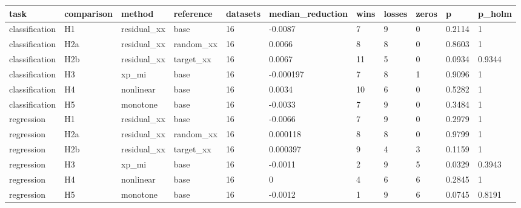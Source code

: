 \begin{tabular}{lllllllllll}
\toprule
task & comparison & method & reference & datasets & median\_reduction & wins & losses & zeros & p & p\_holm \\
\midrule
classification & H1 & residual\_xx & base & 16 & -0.0087 & 7 & 9 & 0 & 0.2114 & 1 \\
classification & H2a & residual\_xx & random\_xx & 16 & 0.0066 & 8 & 8 & 0 & 0.8603 & 1 \\
classification & H2b & residual\_xx & target\_xx & 16 & 0.0067 & 11 & 5 & 0 & 0.0934 & 0.9344 \\
classification & H3 & xp\_mi & base & 16 & -0.000197 & 7 & 8 & 1 & 0.9096 & 1 \\
classification & H4 & nonlinear & base & 16 & 0.0034 & 10 & 6 & 0 & 0.5282 & 1 \\
classification & H5 & monotone & base & 16 & -0.0033 & 7 & 9 & 0 & 0.3484 & 1 \\
regression & H1 & residual\_xx & base & 16 & -0.0066 & 7 & 9 & 0 & 0.2979 & 1 \\
regression & H2a & residual\_xx & random\_xx & 16 & 0.000118 & 8 & 8 & 0 & 0.9799 & 1 \\
regression & H2b & residual\_xx & target\_xx & 16 & 0.000397 & 9 & 4 & 3 & 0.1159 & 1 \\
regression & H3 & xp\_mi & base & 16 & -0.0011 & 2 & 9 & 5 & 0.0329 & 0.3943 \\
regression & H4 & nonlinear & base & 16 & 0 & 4 & 6 & 6 & 0.2845 & 1 \\
regression & H5 & monotone & base & 16 & -0.0012 & 1 & 9 & 6 & 0.0745 & 0.8191 \\
\bottomrule
\end{tabular}
